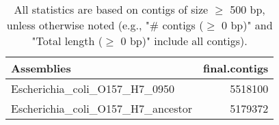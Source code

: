 \documentclass[12pt,a4paper]{article}
\begin{document}
\begin{table}[ht]
\begin{center}
\caption{All statistics are based on contigs of size $\geq$ 500 bp, unless otherwise noted (e.g., "\# contigs ($\geq$ 0 bp)" and "Total length ($\geq$ 0 bp)" include all contigs).}
\begin{tabular}{|l*{1}{|r}|}
\hline
Assemblies & final.contigs \\ \hline
Escherichia\_coli\_O157\_H7\_0950 & 5518100 \\ \hline
Escherichia\_coli\_O157\_H7\_ancestor & 5179372 \\ \hline
\end{tabular}
\end{center}
\end{table}
\end{document}
